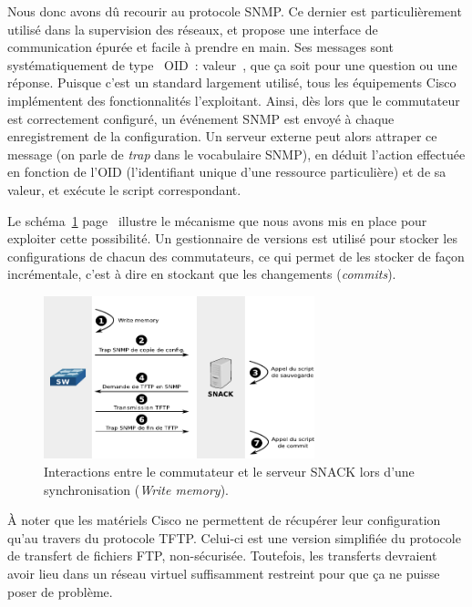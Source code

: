 Nous donc avons dû recourir au protocole SNMP. Ce dernier est particulièrement utilisé dans la supervision des réseaux, et propose une interface de communication épurée et facile à prendre en main. Ses messages sont systématiquement de type \og~OID~: valeur~\fg, que ça soit pour une question ou une réponse. Puisque c'est un standard largement utilisé, tous les équipements Cisco implémentent des fonctionnalités l'exploitant. Ainsi, dès lors que le commutateur est correctement configuré, un événement SNMP est envoyé à chaque enregistrement de la configuration. Un serveur externe peut alors attraper ce message (on parle de \emph{trap} dans le vocabulaire SNMP), en déduit l'action effectuée en fonction de l'OID (l'identifiant unique d'une ressource particulière) et de sa valeur, et exécute le script correspondant.

Le schéma~\ref{schema_wrmem} page~\pageref{schema_wrmem} illustre le mécanisme que nous avons mis en place pour exploiter cette possibilité. Un gestionnaire de versions est utilisé pour stocker les configurations de chacun des commutateurs, ce qui permet de les stocker de façon incrémentale, c'est à dire en stockant que les changements (\emph{commits}).

\begin{figure}[!h]
	\begin{center}
	    \includegraphics[width=0.7\textwidth]{img/wrmem.pdf}
	\end{center}
	\caption{Interactions entre le commutateur et le serveur SNACK lors d'une synchronisation (\emph{Write memory}).}
	\label{schema_wrmem}
\end{figure}

À noter que les matériels Cisco ne permettent de récupérer leur configuration qu'au travers du protocole TFTP. Celui-ci est une version simplifiée du protocole de transfert de fichiers FTP, non-sécurisée. Toutefois, les transferts devraient avoir lieu dans un réseau virtuel suffisamment restreint pour que ça ne puisse poser de problème.

